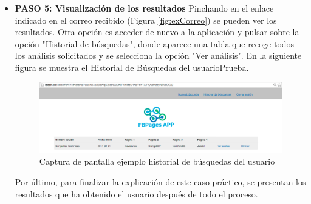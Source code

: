 \begin{itemize}
\item \textbf{PASO 5: Visualización de los resultados}
Pinchando en el enlace indicado en el correo recibido (Figura \ref{fig:exCorreo}) se pueden ver los resultados. Otra opción es acceder de nuevo a la aplicación y pulsar sobre la opción "Historial de búsquedas", donde aparece una tabla que recoge todos los análisis solicitados y se selecciona la opción "Ver análisis". En la siguiente figura se muestra el Historial de Búsquedas del usuarioPrueba. 
\begin{figure}[H]
\centering
\includegraphics[width=5in]{figuras/ejemploHistorialUser.png}
\caption{Captura de pantalla ejemplo historial de búsquedas del usuario} \label{fig:exHistorial}
\end{figure}

Por último, para finalizar la explicación de este caso práctico, se presentan los resultados que ha obtenido el usuario después de todo el proceso.


\end{itemize}
